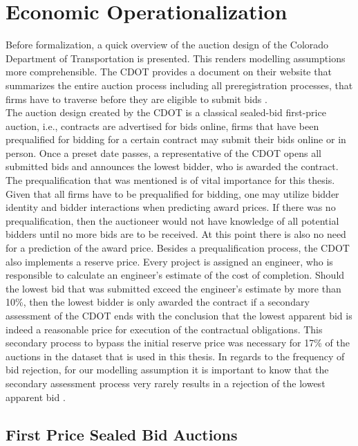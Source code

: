 \documentclass[a4paper,12pt, headsepline]{scrartcl}
\numberwithin{equation}{section}
\begin{document}
\section{Economic Operationalization}\label{sec:op}

Before formalization, a quick overview of the auction design of the Colorado Department of Transportation is presented. This renders modelling assumptions more comprehensible. The CDOT provides a document on their website that summarizes the entire auction process including all preregistration processes, that firms have to traverse before they are eligible to submit bids \citep{CDOTRul}.\\
The auction design created by the CDOT is a classical sealed-bid first-price auction, i.e., contracts are advertised for bids online, firms that have been prequalified for bidding for a certain contract may submit their bids online or in person. Once a preset date passes, a representative of the CDOT opens all submitted bids and announces the lowest bidder, who is awarded the contract. The prequalification that was mentioned is of vital importance for this thesis. Given that all firms have to be prequalified for bidding, one may utilize bidder identity and bidder interactions when predicting award prices. If there was no prequalification, then the auctioneer would not have knowledge of all potential bidders until no more bids are to be received. At this point there is also no need for a prediction of the award price. Besides a prequalification process, the CDOT also implements a reserve price. Every project is assigned an engineer, who is responsible to calculate an engineer's estimate of the cost of completion. Should the lowest bid that was submitted exceed the engineer's estimate by more than 10\%, then the lowest bidder is only awarded the contract if a secondary assessment of the CDOT ends with the conclusion that the lowest apparent bid is indeed a reasonable price for execution of the contractual obligations. This secondary process to bypass the initial reserve price was necessary for 17\% of the auctions in the dataset that is used in this thesis. In regards to the frequency of bid rejection, for our modelling assumption it is important to know that the secondary assessment process very rarely results in a rejection of the lowest apparent bid \citep{CDOTRul}. 

\subsection{First Price Sealed Bid Auctions}\label{subsec:fpsba}
\end{document}
